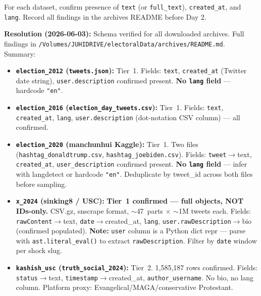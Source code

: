 \documentclass[11pt]{article}
\begin{document}
\begin{taskbox}
{  {\sloppy For each dataset, confirm presence of \texttt{text} (or
  \texttt{full\_text}), \texttt{created\_at}, and \texttt{lang}.
  Record all findings in the archives README before Day 2.\par}

  \smallskip
  \textbf{Resolution (2026-06-03):} Schema verified for all downloaded archives.
  Full findings in
  \texttt{/Volumes/JUHIDRIVE/electoralData/archives/README.md}.
  Summary:

  \begin{itemize}[leftmargin=1.6em, itemsep=2pt]
    \item \textbf{\texttt{election\_2012} (\texttt{tweets.json}):} Tier~1.
          Fields: \texttt{text}, \texttt{created\_at} (Twitter date string),
          \texttt{user.description} confirmed present.
          \textbf{No \texttt{lang} field} --- hardcode \texttt{"en"}.

    \item \textbf{\texttt{election\_2016} (\texttt{election\_day\_tweets.csv}):} Tier~1.
          Fields: \texttt{text}, \texttt{created\_at}, \texttt{lang},
          \texttt{user.description} (dot-notation CSV column) --- all confirmed.

    \item \textbf{\texttt{election\_2020} (manchunhui Kaggle):} Tier~1.
          Two files (\texttt{hashtag\_donaldtrump.csv}, \texttt{hashtag\_joebiden.csv}).
          Fields: \texttt{tweet}$\to$text, \texttt{created\_at}, \texttt{user\_description}
          confirmed present.
          \textbf{No \texttt{lang} field} --- infer with langdetect or hardcode \texttt{"en"}.
          Deduplicate by tweet\_id across both files before sampling.

    \item \textbf{\texttt{x\_2024} (sinking8 / USC):} \textbf{Tier~1 confirmed ---
          full objects, NOT IDs-only.} CSV.gz, snscrape format, $\sim$47~parts
          $\times$ $\sim$1M tweets each.
          Fields: \texttt{rawContent}$\to$text, \texttt{date}$\to$created\_at,
          \texttt{lang}, \texttt{user.rawDescription}$\to$bio (confirmed populated).
          \textbf{Note:} \texttt{user} column is a Python dict repr --- parse with
          \texttt{ast.literal\_eval()} to extract \texttt{rawDescription}.
          Filter by \texttt{date} window per shock slug.

    \item \textbf{\texttt{kashish\_usc} (\texttt{truth\_social\_2024}):} Tier~2.
          1,585,187 rows confirmed. Fields: \texttt{status}$\to$text,
          \texttt{timestamp}$\to$created\_at, \texttt{author\_username}.
          No bio, no lang column. Platform proxy: Evangelical/MAGA/conservative Protestant.


\end{itemize}}
\end{taskbox}
\end{document}
